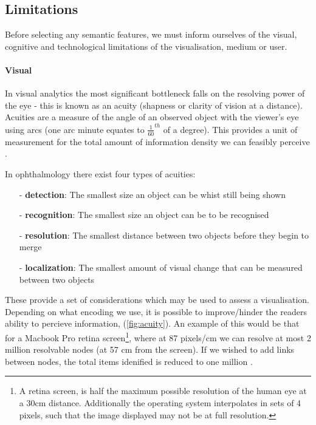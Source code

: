 \subsection{Limitations}

Before selecting any semantic features, we must inform ourselves of the visual, cognitive and technological limitations of the visualisation, medium or user. 

\paragraph{Visual}
In visual analytics the most significant bottleneck falls on the resolving power of the eye - this is known as an acuity (shapness or clarity of vision at a distance). Acuities are a measure of the angle of an observed object with the viewer's eye using arcs (one arc minute equates to $\frac{1}{60}^{th}$ of a degree). This provides a unit of measurement for the total amount of information density we can feasibly perceive \citep{ware}. 

 In ophthalmology there exist four types of  acuities: 
\begin{itemize}
\item[-] \textbf{detection}: The smallest size an object can be whist still being shown
\item[-] \textbf{recognition}: The smallest size an object can be to be recognised
\item[-] \textbf{resolution}: The smallest distance between two objects before they begin to merge
\item[-] \textbf{localization}: The smallest amount of visual change that can be measured between two objects
\end{itemize}

These provide a set of considerations which may be used to assess a visualisation. Depending on what encoding we use, it is possible to improve/hinder the readers ability to percieve information, (\autoref{fig:acuity}). An example of this would be that for a Macbook Pro retina screen\footnote{A retina screen, is half the maximum possible resolution of the human eye at a 30cm distance. Additionally the operating system interpolates in sets of 4 pixels, such that the image displayed may not be at full resolution.}, where at 87 pixels/cm we can resolve at most 2 million resolvable nodes (at 57 cm from the screen). If we wished to add links between nodes, the total items idenified is reduced to one million
\citep{ch10}. 


